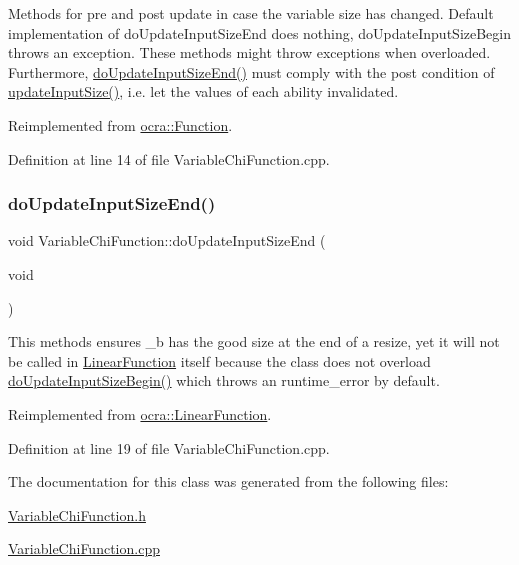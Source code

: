 Methods for pre and post update in case the variable size has changed. Default implementation of do\+Update\+Input\+Size\+End does nothing, do\+Update\+Input\+Size\+Begin throws an exception. These methods might throw exceptions when overloaded. Furthermore, {\ttfamily \hyperlink{classocra_1_1VariableChiFunction_adbc1bb06d86e8ef65e8cdeb55db15353}{do\+Update\+Input\+Size\+End()}} must comply with the post condition of {\ttfamily \hyperlink{classocra_1_1Function_a3a5b9e6ae296339acc87ab2cbf97ef98}{update\+Input\+Size()}}, i.\+e. let the values of each ability invalidated. 

Reimplemented from \hyperlink{classocra_1_1Function_a3f728f3758e6448aa59932853db5ddcc}{ocra\+::\+Function}.



Definition at line 14 of file Variable\+Chi\+Function.\+cpp.

\hypertarget{classocra_1_1VariableChiFunction_adbc1bb06d86e8ef65e8cdeb55db15353}{}\label{classocra_1_1VariableChiFunction_adbc1bb06d86e8ef65e8cdeb55db15353} 
\subsubsection{\texorpdfstring{do\+Update\+Input\+Size\+End()}{doUpdateInputSizeEnd()}}
{\footnotesize\ttfamily void Variable\+Chi\+Function\+::do\+Update\+Input\+Size\+End (\begin{DoxyParamCaption}\item[{void}]{ }\end{DoxyParamCaption})\hspace{0.3cm}{\ttfamily [virtual]}}

This methods ensures \+\_\+b has the good size at the end of a resize, yet it will not be called in \hyperlink{classocra_1_1LinearFunction}{Linear\+Function} itself because the class does not overload \hyperlink{classocra_1_1VariableChiFunction_ad58b8fbb68e8cb27aab585f40875918f}{do\+Update\+Input\+Size\+Begin()} which throws an runtime\+\_\+error by default. 

Reimplemented from \hyperlink{classocra_1_1LinearFunction_ac6bdf62ad6634397778d5f4223ed6d82}{ocra\+::\+Linear\+Function}.



Definition at line 19 of file Variable\+Chi\+Function.\+cpp.



The documentation for this class was generated from the following files\+:\begin{DoxyCompactItemize}
\item 
\hyperlink{VariableChiFunction_8h}{Variable\+Chi\+Function.\+h}\item 
\hyperlink{VariableChiFunction_8cpp}{Variable\+Chi\+Function.\+cpp}\end{DoxyCompactItemize}
